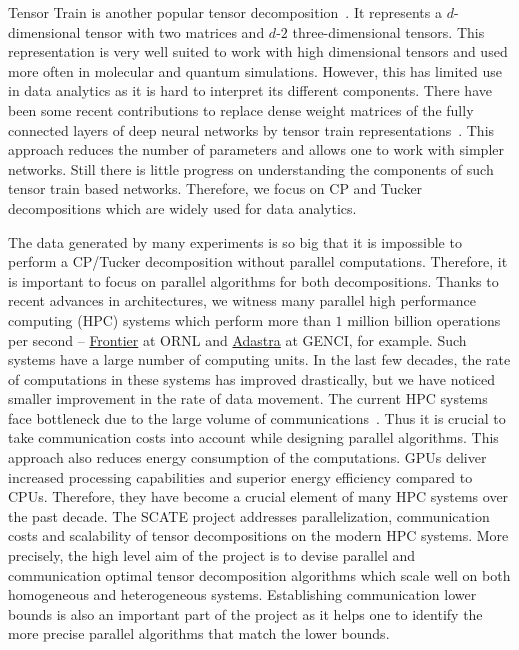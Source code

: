\documentclass[a4paper,11pt]{article}
\begin{document}
	
	 
	Tensor Train is another popular tensor decomposition~\cite{O-SIAM-2011}. It represents a $d$-dimensional tensor with two matrices and $d$-$2$ three-dimensional tensors. This representation is very well suited to work with high dimensional tensors and used more often in molecular and quantum simulations. However, this has limited use in data analytics as it is hard to interpret its different components. There have been some recent contributions to replace dense weight matrices of the fully connected layers of deep neural networks by tensor train representations~\cite{NPOV-NIPS-2015}. This approach reduces the number of parameters and allows one to work with simpler networks. Still there is little progress on understanding the components of such tensor train based networks. Therefore, we focus on CP and Tucker decompositions which are widely used for data analytics. 
	
	
	The data generated by many experiments is so big that it is impossible to perform a CP/Tucker decomposition without parallel computations. Therefore, it is important to focus on parallel algorithms for both decompositions. Thanks to recent advances in architectures, we witness many parallel high performance computing (HPC) systems which perform more than $1$ million billion operations per second -- \href{https://www.olcf.ornl.gov/frontier}{Frontier} at ORNL and \href{https://www.genci.fr/en/our-computers}{Adastra} at GENCI, for example. Such systems have a large number of computing units. In the last few decades, the rate of computations in these systems has improved drastically, but we have noticed smaller improvement in the rate of data movement. The current HPC systems face bottleneck due to the large volume of communications~\cite{DOE-Report-2014}. Thus it is crucial to take communication costs into account while designing parallel algorithms. This approach also reduces energy consumption of the computations. GPUs deliver increased processing capabilities and superior energy efficiency compared to CPUs. Therefore, they have become a crucial element of many HPC systems over the past decade. The SCATE project addresses parallelization, communication costs and scalability of tensor decompositions on the modern HPC systems. More precisely, the high level aim of the project is to devise parallel and communication optimal tensor decomposition algorithms which scale well on both homogeneous and heterogeneous systems. Establishing communication lower bounds is also an important part of the project as it helps one to identify the more precise parallel algorithms that match the lower bounds.
	
\end{document}
